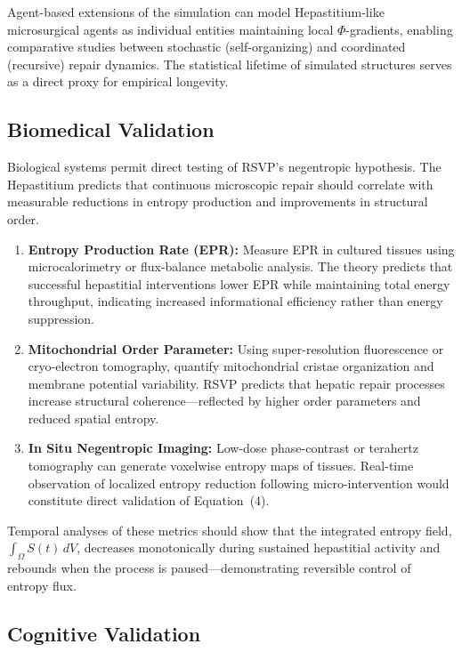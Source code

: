 \documentclass[12pt]{article}
\begin{document}
Agent-based extensions of the simulation can model Hepastitium-like
microsurgical agents as individual entities maintaining local
\(\Phi\)-gradients, enabling comparative studies between stochastic
(self-organizing) and coordinated (recursive) repair dynamics.  The
statistical lifetime of simulated structures serves as a direct proxy
for empirical longevity.

\subsection{Biomedical Validation}

Biological systems permit direct testing of RSVP's negentropic
hypothesis.  The Hepastitium predicts that continuous microscopic repair
should correlate with measurable reductions in entropy production and
improvements in structural order.

\begin{enumerate}[label=(\alph*)]
  \item \textbf{Entropy Production Rate (EPR):}
        Measure EPR in cultured tissues using microcalorimetry or
        flux-balance metabolic analysis.  The theory predicts that
        successful hepastitial interventions lower EPR while maintaining
        total energy throughput, indicating increased informational
        efficiency rather than energy suppression.
  \item \textbf{Mitochondrial Order Parameter:}
        Using super-resolution fluorescence or cryo-electron tomography,
        quantify mitochondrial cristae organization and membrane
        potential variability.  RSVP predicts that hepatic repair
        processes increase structural coherence—reflected by higher
        order parameters and reduced spatial entropy.
  \item \textbf{In Situ Negentropic Imaging:}
        Low-dose phase-contrast or terahertz tomography can generate
        voxelwise entropy maps of tissues.  Real-time observation of
        localized entropy reduction following micro-intervention would
        constitute direct validation of Equation~(4).
\end{enumerate}

Temporal analyses of these metrics should show that the integrated
entropy field,
\(\int_\Omega S(t)\, dV\), decreases monotonically during sustained
hepastitial activity and rebounds when the process is paused—demonstrating
reversible control of entropy flux.

\subsection{Cognitive Validation}
\end{document}
